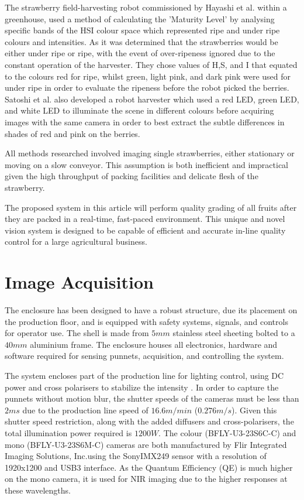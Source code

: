 \documentclass[fleqn,twoside,12pt]{report}
\begin{document}
The strawberry field-harvesting robot commissioned by Hayashi et al.\cite{hayashi} within a greenhouse, used a method of calculating the 'Maturity Level' by analysing specific bands of the HSI colour space which represented ripe and under ripe colours and intensities. As it was determined that the strawberries would be either under ripe or ripe, with the event of over-ripeness ignored due to the constant operation of the harvester. They chose values of H,S, and I that equated to the colours red for ripe, whilst green, light pink, and dark pink were used for under ripe in order to evaluate the ripeness before the robot picked the berries. Satoshi et al.\cite{yamamoto2} also developed a robot harvester which used a red LED, green LED, and white LED to illuminate the scene in different colours before acquiring images with the same camera in order to best extract the subtle differences in shades of red and pink on the berries. 

All methods researched involved imaging single strawberries, either stationary or moving on a slow conveyor. This assumption is both inefficient and impractical given the high throughput of packing facilities and delicate flesh of the strawberry.

The proposed system in this article will perform quality grading of all fruits after they are packed in a real-time, fast-paced environment. This unique and novel vision system is designed to be capable of efficient and accurate in-line quality control for a large agricultural business.   



\section{Image Acquisition}

The enclosure has been designed to have a robust structure, due its placement on the production floor, and is equipped with safety systems, signals, and controls for operator use. The shell is made from $5mm$ stainless steel sheeting bolted to a $40mm$ aluminium frame. The enclosure houses all electronics, hardware and software required for sensing punnets, acquisition, and controlling the system.

The system encloses part of the production line for lighting control, using DC power and cross polarisers to stabilize the intensity \cite{eaton}. In order to capture the punnets without motion blur, the shutter speeds of the cameras must be less than $2ms$ due to the production line speed of $16.6m/min$ ($0.276m/s$). Given this shutter speed restriction, along with the added diffusers and cross-polarisers, the total illumination power required is $1200W$. The colour (BFLY-U3-23S6C-C) and mono (BFLY-U3-23S6M-C) cameras are both manufactured by Flir Integrated Imaging Solutions, Inc.\textregistered using the Sony\textregistered IMX249 sensor with a resolution of 1920x1200 and USB3 interface. As the Quantum Efficiency (QE) is much higher on the mono camera, it is used for NIR imaging due to the higher responses at these wavelengths.
\end{document}
